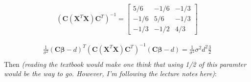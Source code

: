 \documentclass[paper=a4, fontsize=11pt]{scrartcl} %
\newcommand{\vecBeta}{\mathbf{\beta}}
\newcommand{\matC}{\mathbf{C}}
\newcommand{\matX}{\mathbf{X}}
\begin{document}
$$
(\matC (\matX^T \matX ) \matC^T)^{-1} = 
\begin{bmatrix} 5/6 & -1/6& -1/3 \\
                             -1/6 & 5/6 & -1/3 \\
                             -1/3& -1/2 & 4/3
\end{bmatrix}
$$


\begin{align*}
\frac{1}{\sigma^2}(\matC \vecBeta - d)^T (\matC (\matX^T \matX ) \matC^T)^{-1}  (\matC \vecBeta - d) = \frac{1}{\sigma^2} \sigma^2 d^2 \frac{3}{2}\\
\end{align*}
Then \emph{(reading the textbook would make one think that using 1/2 of this paramter would be the way to go. However, I'm following the lecture notes here)}:\\
\begin{center}
\\
\end{center}
\end{document}
